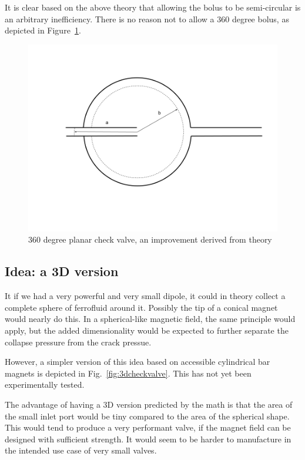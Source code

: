\documentclass[]{asme2ej}
\begin{document}
It is clear based on the above theory that allowing the bolus to be semi-circular
is an arbitrary inefficiency. There is no reason not to allow a 360 degree bolus,
as depicted in Figure~\ref{fig:360}.

\begin{figure}
\centerline{\includegraphics[width=6in]{figure/360degreeplanarcheckvalve.png}}
\caption{360 degree planar check valve, an improvement derived from theory}
\label{fig:360}
\end{figure}

\subsection{Idea: a 3D version}

It if we had a very powerful and very small dipole, it could in theory
collect a complete sphere of ferrofluid around it. Possibly the tip
of a conical magnet would nearly do this.
In a spherical-like magnetic field, the same principle would
apply, but the added dimensionality would be expected to further
separate the collapse pressure from the crack pressue.

However, a simpler version of this idea based on accessible
cylindrical bar magnets is depicted in Fig.~\ref{fig:3dcheckvalve}.
This has not yet been experimentally tested.

The advantage of having a 3D version predicted by the math is that the area
of the small inlet port would be tiny compared to the area of the spherical
shape. This would tend to produce a very performant valve, if the magnet
field can be designed with sufficient strength. It would seem to be harder
to manufacture in the intended use case of very small valves.
\end{document}
